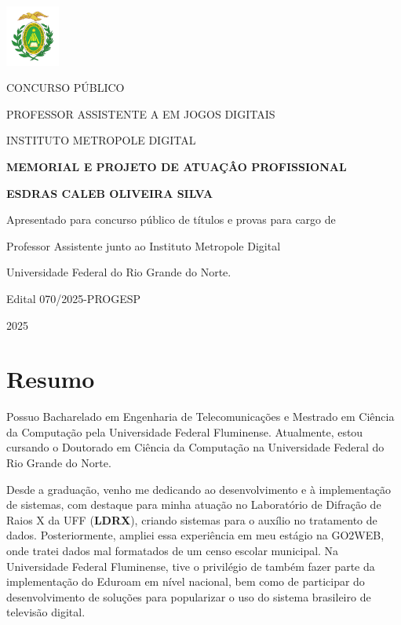 \documentclass[10pt,a4paper,oneside]{book}
\newcommand{\Year}{2025}
\newcommand{\Author}{Esdras Caleb Oliveira Silva}
\newcommand{\UFF}{Universidade Federal Fluminense}
\newcommand{\UFRN}{Universidade Federal do Rio Grande do Norte}
\begin{document}
\pagestyle{plain}
\frontmatter

\begin{titlepage}
  \begin{center}
    \includegraphics[height=2cm]{images/logo.pdf}
    \vspace{1cm}

    CONCURSO PÚBLICO

    PROFESSOR ASSISTENTE A EM JOGOS DIGITAIS

    INSTITUTO METROPOLE DIGITAL
    \vspace{5cm}

    \textbf{\LARGE MEMORIAL E PROJETO DE ATUAÇÂO PROFISSIONAL}
    \vspace{1cm}

    \textbf{\LARGE \MakeUppercase{\Author{}}}
    \vspace{5cm}

    {\small
      Apresentado para concurso público de títulos e provas para cargo de

      Professor Assistente junto ao Instituto Metropole Digital

      Universidade Federal do Rio Grande do Norte.
      \vspace{1cm}

      Edital 070/2025-PROGESP
    }
    \vfill

    \Year{}
  \end{center}
\end{titlepage}

\chapter*{Resumo}

Possuo Bacharelado em Engenharia de Telecomunicações e Mestrado em Ciência da Computação pela \UFF{}.
Atualmente, estou cursando o Doutorado em Ciência da Computação na \UFRN{}.

Desde a graduação, venho me dedicando ao desenvolvimento e à implementação de sistemas, com destaque para minha atuação
no Laboratório de Difração de Raios X da UFF (\textbf{LDRX}), criando sistemas para o auxílio no tratamento de dados.
Posteriormente, ampliei essa experiência em meu estágio na GO2WEB, onde tratei dados mal formatados de um censo escolar
municipal. Na \UFF{}, tive o privilégio de também fazer parte da implementação do Eduroam em nível nacional, bem como de
participar do desenvolvimento de soluções para popularizar o uso do sistema brasileiro de televisão digital.
\end{document}
